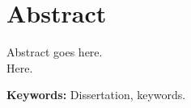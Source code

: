 
\chapter*{Abstract}

Abstract goes here.\\
Here.\\


\par
\textbf{Keywords:} Dissertation, keywords.

